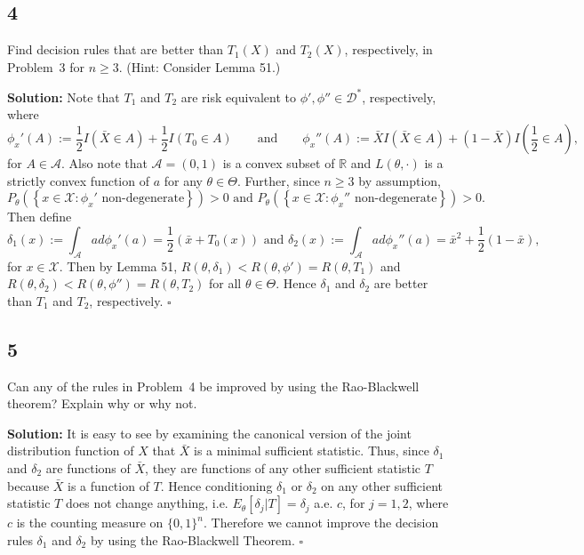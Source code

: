 \documentclass[12pt]{article}
\newcounter{ProofCounter}
\newenvironment{Solution}{\stepcounter{ProofCounter}\textbf{Solution:}}{\hfill$\square$}
\begin{document}
\subsection*{4}
\begin{tcolorbox}
  Find decision rules that are better than $T_1(X)$ and $T_2(X)$, respectively, in Problem~3 for $n\geq 3$.  (Hint: Consider Lemma 51.)
\end{tcolorbox}

\begin{Solution}
  Note that $T_1$ and $T_2$ are risk equivalent to $\phi', \phi'' \in \mathcal{D}^*$, respectively, where 
  \[ 
    \phi_x'(A) := \frac{1}{2}I(\bar{X} \in A) + \frac{1}{2}I(T_0 \in A) \qquad \text{and} \qquad 
    \phi_x''(A) := \bar{X}I(\bar{X} \in A) + (1-\bar{X})I\left( \frac{1}{2} \in A \right),
  \]
  for $A \in \mathcal{A}$. Also note that $\mathcal{A} = (0,1)$ is a convex subset of $\mathbb{R}$ and $L(\theta, \cdot)$ is a strictly convex
  function of $a$ for any $\theta \in \Theta$. Further, since $n \geq 3$ by assumption, 
  \[
    P_{\theta}\left(\left\{ x \in \mathcal{X} : \phi_x' \text{ non-degenerate} \right\} \right) > 0 \text{ and }  
    P_{\theta}\left(\left\{ x \in \mathcal{X} : \phi_x'' \text{ non-degenerate} \right\} \right) > 0.
  \]
  Then define 
  \[
    \delta_1(x) := \int_{\mathcal{A}}ad\phi_x'(a) = \frac{1}{2}\left( \bar{x} + T_0(x) \right) \text{ and } \delta_2(x) :=
    \int_{\mathcal{A}}ad\phi_x''(a) = \bar{x}^2 + \frac{1}{2}(1-\bar{x}),
  \]
  for $x \in \mathcal{X}$. Then by Lemma 51, $R(\theta, \delta_1) < R(\theta, \phi') = R(\theta, T_1)$ and $R(\theta, \delta_2) < R(\theta, \phi'') =
  R(\theta, T_2)$ for all $\theta \in \Theta$. Hence $\delta_1$ and $\delta_2$ are better than $T_1$ and $T_2$, respectively.
\end{Solution}

\newpage

\subsection*{5}
\begin{tcolorbox}
  Can any of the rules in Problem~4 be improved by using the Rao-Blackwell theorem?  Explain why or why not.
\end{tcolorbox}

\begin{Solution}
  It is easy to see by examining the canonical version of the joint distribution function of $X$ that $\bar{X}$ is a minimal sufficient statistic.
  Thus, since $\delta_1$ and $\delta_2$ are functions of $\bar{X}$, they are functions of any other sufficient statistic $T$ because $\bar{X}$ is a
  function of $T$. Hence conditioning $\delta_1$ or $\delta_2$ on any other sufficient statistic $T$ does not change anything, i.e.
  $E_{\theta}[\delta_j|T] = \delta_j$ a.e. $c$, for $j = 1,2$, where $c$ is the counting measure on $\{0,1\}^n$. Therefore we cannot improve the
  decision rules $\delta_1$ and $\delta_2$ by using the Rao-Blackwell Theorem.
\end{Solution}
\end{document}
